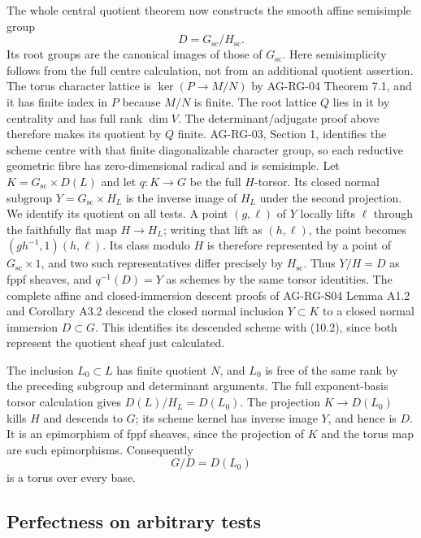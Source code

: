 \documentclass[11pt,a4paper,openany]{report}
\begin{document}
The whole central quotient theorem now constructs the smooth affine semisimple group \[
 D=G_{\mathrm{sc}}/H_{\mathrm{sc}}.                         \tag{10.2}
\] Its root groups are the canonical images of those of \(G_{\mathrm{sc}}\). Here semisimplicity follows from the full centre calculation, not from an additional quotient assertion. The torus character lattice is \(\ker(P\to M/N)\) by AG-RG-04 Theorem 7.1, and it has finite index in \(P\) because \(M/N\) is finite. The root lattice \(Q\) lies in it by centrality and has full rank \(\dim V\). The determinant/adjugate proof above therefore makes its quotient by \(Q\) finite. AG-RG-03, Section 1, identifies the scheme centre with that finite diagonalizable character group, so each reductive geometric fibre has zero-dimensional radical and is semisimple. Let \(K=G_{\mathrm{sc}}\times D(L)\) and let \(q:K\to G\) be the full \(H\)-torsor. Its closed normal subgroup \(Y=G_{\mathrm{sc}}\times H_L\) is the inverse image of \(H_L\) under the second projection. We identify its quotient on all tests. A point \((g,\ell)\) of \(Y\) locally lifts \(\ell\) through the faithfully flat map \(H\to H_L\); writing that lift as \((h,\ell)\), the point becomes \((gh^{-1},1)(h,\ell)\). Its class modulo \(H\) is therefore represented by a point of \(G_{\mathrm{sc}}\times1\), and two such representatives differ precisely by \(H_{\mathrm{sc}}\). Thus \(Y/H=D\) as fppf sheaves, and \(q^{-1}(D)=Y\) as schemes by the same torsor identities. The complete affine and closed-immersion descent proofs of AG-RG-S04 Lemma A1.2 and Corollary A3.2 descend the closed normal inclusion \(Y\subset K\) to a closed normal immersion \(D\subset G\). This identifies its descended scheme with (10.2), since both represent the quotient sheaf just calculated.

The inclusion \(L_0\subset L\) has finite quotient \(N\), and \(L_0\) is free of the same rank by the preceding subgroup and determinant arguments. The full exponent-basis torsor calculation gives \(D(L)/H_L=D(L_0)\). The projection \(K\to D(L_0)\) kills \(H\) and descends to \(G\); its scheme kernel has inverse image \(Y\), and hence is \(D\). It is an epimorphism of fppf sheaves, since the projection of \(K\) and the torus map are such epimorphisms. Consequently \[
 G/D=D(L_0)
\] is a torus over every base.

\subsection{Perfectness on arbitrary tests}\label{AG-RG-05-perfectness-on-arbitrary-tests}
\end{document}

